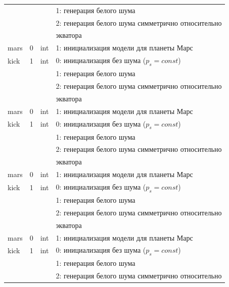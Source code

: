 \begin{longtable}[c]{|l|c|l|l|}
             &        &     & 1: генерация белого шума                          \\
             &        &     & 2: генерация белого шума симметрично относительно \\
             &        &     & экватора                                          \\
    mars     & 0      & int & 1: инициализация модели для планеты Марс          \\
    kick     & 1      & int & 0: инициализация без шума (\(p_s = const\))       \\
             &        &     & 1: генерация белого шума                          \\
             &        &     & 2: генерация белого шума симметрично относительно \\
             &        &     & экватора                                          \\
    mars     & 0      & int & 1: инициализация модели для планеты Марс          \\
    kick     & 1      & int & 0: инициализация без шума (\(p_s = const\))       \\
             &        &     & 1: генерация белого шума                          \\
             &        &     & 2: генерация белого шума симметрично относительно \\
             &        &     & экватора                                          \\
    mars     & 0      & int & 1: инициализация модели для планеты Марс          \\
    kick     & 1      & int & 0: инициализация без шума (\(p_s = const\))       \\
             &        &     & 1: генерация белого шума                          \\
             &        &     & 2: генерация белого шума симметрично относительно \\
             &        &     & экватора                                          \\
    mars     & 0      & int & 1: инициализация модели для планеты Марс          \\
    kick     & 1      & int & 0: инициализация без шума (\(p_s = const\))       \\
             &        &     & 1: генерация белого шума                          \\
             &        &     & 2: генерация белого шума симметрично относительно \\

\end{longtable}
